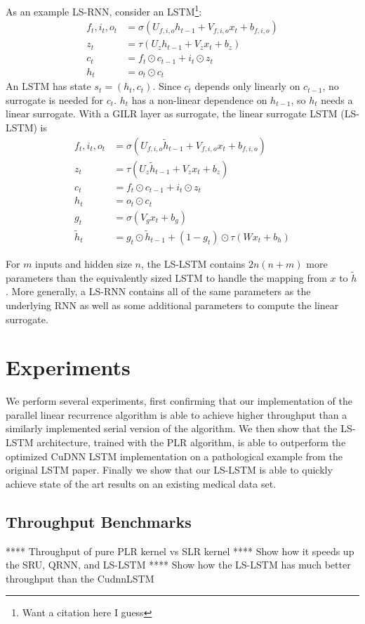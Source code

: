 \documentclass{article}
\begin{document}
As an example LS-RNN, consider an LSTM\footnote{Want a citation here I guess}:
\begin{align*}
f_t, i_t, o_t &= \sigma(U_{f,i,o} h_{t-1} + V_{f,i,o} x_t + b_{f,i,o}) \\
z_t &= \tau(U_z h_{t-1} + V_z x_t + b_z) \\
c_t &= f_t \odot c_{t-1} + i_t \odot z_t \\
h_t &= o_t \odot c_t
\end{align*}
An LSTM has state $s_t = (h_t, c_t)$. Since $c_t$ depends only linearly on $c_{t-1}$, no surrogate is needed for $c_t$. $h_t$ has a non-linear dependence on $h_{t-1}$, so $h_t$ needs a linear surrogate. With a GILR layer as surrogate, the linear surrogate LSTM (LS-LSTM) is
\begin{align*}
f_t, i_t, o_t &= \sigma(U_{f,i,o} \tilde{h}_{t-1} + V_{f,i,o} x_t + b_{f,i,o}) \\
z_t &= \tau(U_z \tilde{h}_{t-1} + V_z x_t + b_z) \\
c_t &= f_t \odot c_{t-1} + i_t \odot z_t \\
h_t &= o_t \odot c_t \\
g_t &= \sigma(V_g x_t + b_g) \\
\tilde{h}_t &= g_t \odot \tilde{h}_{t-1} + (1-g_t)\odot \tau(Wx_t + b_h)
\end{align*}

For $m$ inputs and hidden size $n$, the LS-LSTM contains $2n(n+m)$ more parameters than the equivalently sized LSTM to handle the mapping from $x$ to $\tilde{h}$. More generally, a LS-RNN contains all of the same parameters as the underlying RNN as well as some additional parameters to compute the linear surrogate.

\section{Experiments}
We perform several experiments, first confirming that our implementation of the
parallel linear recurrence algorithm is able to achieve higher throughput than a
similarly implemented serial version of the algorithm. We then show that the
LS-LSTM architecture, trained with the PLR algorithm, is able to outperform the
optimized CuDNN LSTM implementation on a pathological example from the original
LSTM paper. Finally we show that our LS-LSTM is able to quickly achieve state of
the art results on an existing medical data set.

\subsection{Throughput Benchmarks}
**** Throughput of pure PLR kernel vs SLR kernel
**** Show how it speeds up the SRU, QRNN, and LS-LSTM
**** Show how the LS-LSTM has much better throughput than the CudnnLSTM
\end{document}
